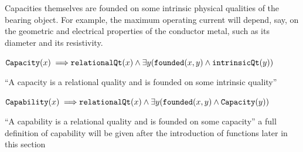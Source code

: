 \documentclass[sw]{iosart2x}
\newcommand{\bflist}{\begin{list}{}{\setlength{\topsep}{2mm}\setlength{\partopsep}{0mm}\setlength{\parsep}{0mm}\setlength{\leftmargin}{9mm}\setlength{\labelwidth}{8mm}}}
\newcommand{\eflist}{\end{list}}
\newcommand{\AxLabel}{\textrm{a}}
\newcounter{cntax}
\newcommand{\myax}[1]{\refstepcounter{cntax}\begin{small}{\bf \AxLabel\thecntax\label{ax:#1}}\end{small}}
\newcommand{\mytext}[1]{``#1''}
\newcommand{\generalStyle}[1]{\texttt{#1}}
\newcommand{\biRel}[3]{\generalStyle{#1}(#2,#3)}
\newcommand{\uniRel}[2]{\generalStyle{#1}(#2)}
\newcommand{\myfi}{\hspace{0.9mm} \Longrightarrow}
\newcommand{\Capability}[1]{\uniRel{Capability}{#1}}
\newcommand{\Capacity}[1]{\uniRel{Capacity}{#1}}
\newcommand{\RelationalQuality}[1]{\uniRel{relationalQt}{#1}}
\newcommand{\IntrinsicQuality}[1]{\uniRel{intrinsicQt}{#1}}
\newcommand{\founded}[2]{\biRel{\foundedTerm{passive}}{#1}{#2}}
\newcommand{\foundedTerm}[1]{%
  \ifthenelse{\equal{#1}{passive}}{founded}{%
    \ifthenelse{\equal{#1}{verb}}{found}{%
      \ifthenelse{\equal{#1}{gerund}}{founding}{%
        ERROR!%
      }%
    }%
  }%
}
\begin{document}
Capacities themselves are founded on some intrinsic physical qualities of the bearing object. For example, the maximum operating current will depend, say, on the geometric and electrical properties of the conductor metal, such as its diameter and its resistivity.      
\bflist
\item[\myax{capacPartialDef}] $ \Capacity{x} \myfi \RelationalQuality{x} \land \exists y(\founded{x}{y} \land \IntrinsicQuality{y}) $  %
\item[] \mytext{A capacity is a relational quality and is founded on some intrinsic quality}
\item[\myax{capabPartialDef}] $ \Capability{x} \myfi \RelationalQuality{x} \land  \exists y (\founded{x}{y} \land \Capacity{y}) $
\item[] \mytext{A capability is a relational quality and is founded on some capacity} a full definition of capability will be given after the introduction of functions later in this section
\eflist
\end{document}
